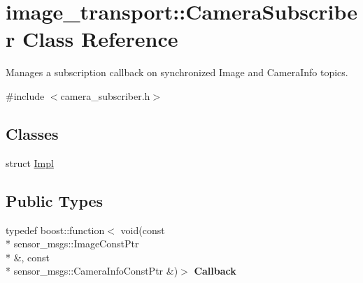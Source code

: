 \hypertarget{classimage__transport_1_1_camera_subscriber}{\section{image\-\_\-transport\-:\-:Camera\-Subscriber Class Reference}
\label{classimage__transport_1_1_camera_subscriber}
}


Manages a subscription callback on synchronized Image and Camera\-Info topics.  




{\ttfamily \#include $<$camera\-\_\-subscriber.\-h$>$}

\subsection*{Classes}
\begin{DoxyCompactItemize}
\item 
struct \hyperlink{structimage__transport_1_1_camera_subscriber_1_1_impl}{Impl}
\end{DoxyCompactItemize}
\subsection*{Public Types}
\begin{DoxyCompactItemize}
\item 
\hypertarget{classimage__transport_1_1_camera_subscriber_abc533a8b0a84b6412549538100aef653}{typedef boost\-::function$<$ void(const \\*
sensor\-\_\-msgs\-::\-Image\-Const\-Ptr \\*
\&, const \\*
sensor\-\_\-msgs\-::\-Camera\-Info\-Const\-Ptr \&)$>$ {\bfseries Callback}}\label{classimage__transport_1_1_camera_subscriber_abc533a8b0a84b6412549538100aef653}

\end{DoxyCompactItemize}
